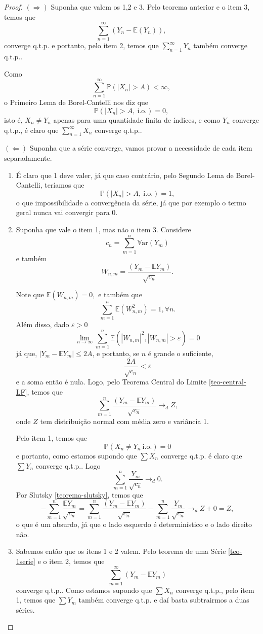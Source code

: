 \documentclass[12pt,a4paper,oneside]{book}
\theoremstyle{definition}
\theoremstyle{remark}
\numberwithin{equation}{section}
\newcommand{\e}{\varepsilon}
\newcommand{\E}{\mathbb{E}}
\newcommand{\pr}{\mathbb{P}}
\newcommand{\ds}{\displaystyle}
\newcommand{\Var}{\mathbb{V}\text{ar}}
\begin{document}
\begin{proof}
\noindent$(\Rightarrow)$
Suponha que valem os 1,2 e 3. Pelo teorema anterior e o item 3, temos que
$$\sum^\infty_{n=1}(Y_n - \E(Y_n)) , $$
converge q.t.p. e portanto, pelo item 2, temos que 
$\ds\sum^\infty_{n=1}Y_n $
também converge q.t.p..

Como 
$$\ds\sum_{n=1}^\infty\pr(|X_n|>A)<\infty,$$
o Primeiro Lema de Borel-Cantelli nos diz que 
$$\pr(|X_n|>A,\ \textrm{i.o.})=0, $$
isto é, $X_n \neq Y_n$ apenas para uma quantidade finita de índices, 
e como $Y_n$ converge q.t.p., é claro que $\sum_{n=1}^\infty X_n$ converge q.t.p..
\bigskip

\noindent $(\Leftarrow)$ Suponha que a série converge, vamos provar a necessidade de cada item separadamente.
\begin{enumerate}
\item É claro que 1 deve valer, já que caso contrário, pelo Segundo Lema de Borel-Cantelli, teríamos que 
$$\pr(|X_n|>A,\ \textrm{i.o.}) = 1, $$
o que impossibilidade a convergência da série, já que por exemplo o termo geral nunca vai convergir para 0.

\item Suponha que vale o item 1, mas não o item 3. Considere 
$$c_n = \sum^n_{m=1} \Var(Y_m) $$
e também
$$W_{n,m} =  \dfrac{(Y_m - \E Y_m)}{\sqrt{c_n}}.$$

Note que $\E(W_{n,m}) = 0, $ e também que 
$$\sum_{m=1}^n \E(W_{n,m}^2)=  1,\forall n. $$
Além disso, dado $\e>0$
$$\lim_{n\rightarrow \infty}\sum_{m=1}^n \E(|W_{n,m}|^2,|W_{n,m}|>\e)= 0 $$
já que,  $|Y_m - \E Y_m|\leq 2A$, e portanto, se $n$ é grande o suficiente,
$$\dfrac{2A}{\sqrt{c_n}}< \e $$
e a soma então é nula. Logo, pelo Teorema Central do Limite \ref{teo-central-LF}, temos que
$$\sum_{m=1}^n\dfrac{(Y_m - \E Y_m)}{\sqrt{c_n}} \longrightarrow_d Z, $$
onde $Z$ tem distribuição normal com média zero e variância 1.

Pelo item 1, temos que
$$\pr(X_n\neq Y_n\ \textrm{i.o.})=0 $$ 
e portanto, como estamos supondo que $\sum X_n$ converge q.t.p. é claro que $\sum Y_n$ converge q.t.p.. Logo
$$\sum_{m=1}^n\dfrac{Y_m}{\sqrt{c_n}} \longrightarrow_d 0. $$
Por Slutsky \ref{teorema-slutsky}, temos que
$$-\sum_{m=1}^n\dfrac{ \E Y_m}{\sqrt{c_n}} = \sum_{m=1}^n\dfrac{(Y_m - \E Y_m)}{\sqrt{c_n}}-  \sum_{m=1}^n\dfrac{ Y_m}{\sqrt{c_n}} \longrightarrow_d Z+0 = Z, $$
o que é um absurdo, já que o lado esquerdo é determinístico e o lado direito não.

\item  Sabemos então que os itens 1 e 2 valem. Pelo teorema de uma Série \ref{teo-1serie} e o item 2, temos que 
$$\sum_{m=1}^\infty(Y_m - \E Y_m) $$
converge q.t.p.. Como estamos supondo que $\sum X_n$ converge q.t.p., pelo item 1, temos que $\sum Y_m$ também converge q.t.p.  e daí basta subtrairmos a duas séries.

\end{enumerate}
\end{proof}
\end{document}
